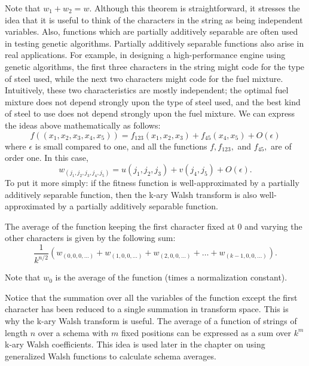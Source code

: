 \begin{example}
Note that $w_1 + w_2 = w$.  Although this theorem is straightforward, it
stresses the idea that it is useful to think of the characters in the string
as being independent variables.  Also, functions which are partially
additively separable are often used in testing genetic algorithms.
Partially additively separable functions also arise in real applications.
For example, in designing a high-performance engine using genetic algorithms,
the first three characters in the string might code for the type of steel
used, while the next two characters might code for the fuel mixture.
Intuitively, these two characteristics are mostly independent; the
optimal fuel mixture does not depend strongly upon the type of steel used,
and the best kind of steel to use does not depend strongly upon the fuel
mixture.  We can express the ideas above mathematically as follows:
\begin{equation}
f((x_1,x_2,x_3,x_4,x_5))=f_{123}(x_1,x_2,x_3) + f_{45}(x_4,x_5) +
	O(\epsilon)
\end{equation}
where $\epsilon$ is small compared to one, and all the functions 
$f, f_{123},$ and $f_{45},$ are of order one.  In this case,
\begin{equation}
w_{(j_1,j_2,j_3,j_4,j_5)}=u(j_1,j_2,j_3)+v(j_4,j_5) + O(\epsilon).
\end{equation}
To put it more simply: if the fitness function is well-approximated by a
partially additively separable function, then the k-ary Walsh transform is
also well-approximated by a partially additively separable function.
\end{example}

\begin{theorem}
The average of the function keeping the first character fixed at $0$ and
varying the other characters is given by the following sum:
\begin{equation}
\frac{1}{k^{n/2}}
(w_{(0,0,0,\ldots)}+w_{(1,0,0,\ldots)}+w_{(2,0,0,\ldots)}+\ldots+
	w_{(k-1,0,0,\ldots)}).
\end{equation}
\end{theorem}
Note that $w_0$ is the average of the function (times a normalization
constant).

Notice that the summation over all the variables of the function except
the first character has been reduced to a
single summation in transform space.  This is why the k-ary Walsh transform is
useful.  The average of a function of strings of length $n$ over a schema 
with $m$ fixed positions can be expressed as a sum over $k^m$ k-ary Walsh
coefficients.  This idea is used later in the chapter on using generalized
Walsh functions to calculate schema averages.

